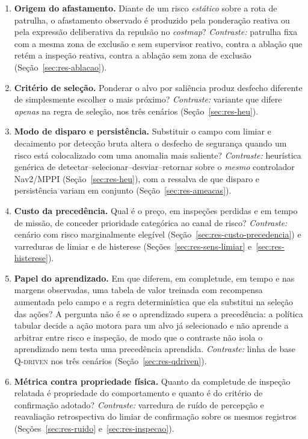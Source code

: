 \begin{enumerate}
    \item \textbf{Origem do afastamento.} Diante de um risco \emph{estático} sobre a
    rota de patrulha, o afastamento observado é produzido pela ponderação reativa ou
    pela expressão deliberativa da repulsão no \textit{costmap}? \emph{Contraste:}
    patrulha fixa com a mesma zona de exclusão e sem supervisor reativo, contra a
    ablação que retém a inspeção reativa, contra a ablação sem zona de exclusão
    (Seção~\ref{sec:res-ablacao}).

    \item \textbf{Critério de seleção.} Ponderar o alvo por saliência produz desfecho
    diferente de simplesmente escolher o mais próximo? \emph{Contraste:} variante que
    difere \emph{apenas} na regra de seleção, nos três cenários
    (Seção~\ref{sec:res-heu}).

    \item \textbf{Modo de disparo e persistência.} Substituir o campo com limiar e
    decaimento por detecção bruta altera o desfecho de segurança quando um risco está
    colocalizado com uma anomalia mais saliente? \emph{Contraste:} heurística genérica
    de detectar--selecionar--desviar--retornar sobre o \emph{mesmo} controlador
    Nav2/MPPI (Seção~\ref{sec:res-heu}), com a ressalva de que disparo e persistência
    variam em conjunto (Seção~\ref{sec:res-ameacas}).

    \item \textbf{Custo da precedência.} Qual é o preço, em inspeções perdidas e em
    tempo de missão, de conceder prioridade categórica ao canal de risco? \emph{
    Contraste:} cenário com risco marginalmente elegível
    (Seção~\ref{sec:res-custo-precedencia}) e varreduras de limiar e de histerese
    (Seções~\ref{sec:res-sens-limiar} e~\ref{sec:res-histerese}).

    \item \textbf{Papel do aprendizado.} Em que diferem, em completude, em tempo e nas
    margens observadas, uma tabela de valor treinada com recompensa aumentada pelo campo
    e a regra determinística que ela substitui na seleção das ações? A pergunta não é se
    o aprendizado supera a precedência: a política tabular decide a ação motora para um
    alvo já selecionado e não aprende a arbitrar entre risco e inspeção, de modo que o
    contraste não isola o aprendizado nem testa uma precedência aprendida.
    \emph{Contraste:} linha de base \textsc{Q-driven} nos três cenários
    (Seção~\ref{sec:res-qdriven}).

    \item \textbf{Métrica contra propriedade física.} Quanto da completude de inspeção
    relatada é propriedade do comportamento e quanto é do critério de confirmação
    adotado? \emph{Contraste:} varredura de ruído de percepção e reavaliação
    retrospectiva do limiar de confirmação sobre os mesmos registros
    (Seções~\ref{sec:res-ruido} e~\ref{sec:res-inspecao}).
\end{enumerate}

